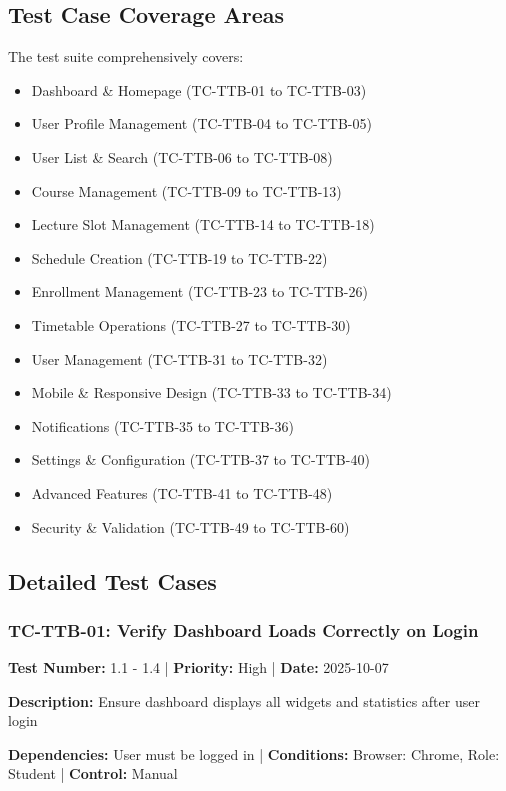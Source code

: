 \subsection{Test Case Coverage Areas}

The test suite comprehensively covers:
\begin{itemize}[leftmargin=*]
    \item Dashboard \& Homepage (TC-TTB-01 to TC-TTB-03)
    \item User Profile Management (TC-TTB-04 to TC-TTB-05)
    \item User List \& Search (TC-TTB-06 to TC-TTB-08)
    \item Course Management (TC-TTB-09 to TC-TTB-13)
    \item Lecture Slot Management (TC-TTB-14 to TC-TTB-18)
    \item Schedule Creation (TC-TTB-19 to TC-TTB-22)
    \item Enrollment Management (TC-TTB-23 to TC-TTB-26)
    \item Timetable Operations (TC-TTB-27 to TC-TTB-30)
    \item User Management (TC-TTB-31 to TC-TTB-32)
    \item Mobile \& Responsive Design (TC-TTB-33 to TC-TTB-34)
    \item Notifications (TC-TTB-35 to TC-TTB-36)
    \item Settings \& Configuration (TC-TTB-37 to TC-TTB-40)
    \item Advanced Features (TC-TTB-41 to TC-TTB-48)
    \item Security \& Validation (TC-TTB-49 to TC-TTB-60)
\end{itemize}

\subsection{Detailed Test Cases}

\subsubsection{TC-TTB-01: Verify Dashboard Loads Correctly on Login}

\textbf{Test Number:} 1.1 - 1.4 | \textbf{Priority:} High | \textbf{Date:} 2025-10-07

\textbf{Description:} Ensure dashboard displays all widgets and statistics after user login

\textbf{Dependencies:} User must be logged in | \textbf{Conditions:} Browser: Chrome, Role: Student | \textbf{Control:} Manual


